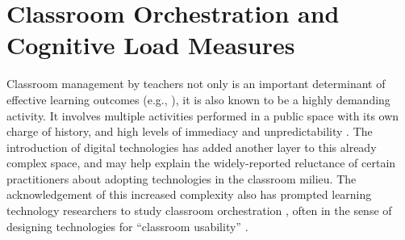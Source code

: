 \documentclass[10pt,journal,compsoc]{IEEEtran}
\begin{document}
%




\section{Classroom Orchestration and Cognitive Load Measures}\label{sec:related}

Classroom management by teachers not only is an important determinant of effective learning outcomes (e.g., \cite{Gomez2013,Onrubia2012}), it is also known to be a highly demanding activity. It involves multiple activities performed in a public space with its own charge of history, and high levels of immediacy and unpredictability \cite{Doyle2006}. The introduction of digital technologies has added another layer to this already complex space, and may help explain the widely-reported reluctance of certain practitioners about adopting technologies in the classroom milieu. The acknowledgement of this increased complexity also has prompted learning technology researchers to study classroom orchestration \cite{Dillenbourg2009, Prieto2011}, often in the sense of designing technologies for ``classroom usability'' \cite{Dillenbourg2011}.
\end{document}

